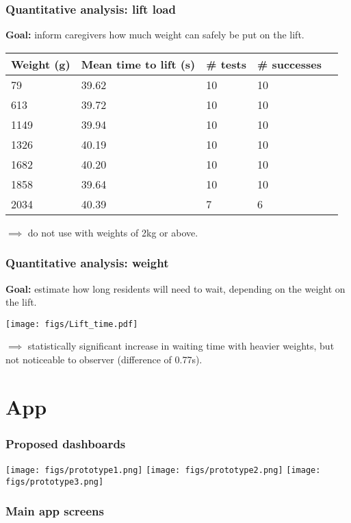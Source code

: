\documentclass{beamer}
\begin{document}
\begin{frame}
  \frametitle{Quantitative analysis: lift load}
  {\bf Goal: } inform caregivers how much weight can safely be put on the lift.
  \begin{center}
    \begin{tabular}{llllr}
      {\bf Weight (g)} & {\bf Mean time to lift (s)} & {\bf \# tests} & {\bf \# successes}\\
      \hline
      79 & 39.62  & 10 & 10  \\
      613 & 39.72 & 10 & 10 \\
      1149 & 39.94 & 10 & 10  \\
      1326 & 40.19 & 10 & 10 \\
      1682 & 40.20 & 10 & 10 \\
      1858 & 39.64 & 10 & 10  \\
      2034 & 40.39 & 7 & 6
    \end{tabular}
  \end{center}
  $\implies$ do not use with weights of 2kg or above. 
\end{frame}

\begin{frame}
  \frametitle{Quantitative analysis: weight}
  {\bf Goal: } estimate how long residents will need to wait, depending on the weight on the lift.
  \begin{center}
    \texttt{[image: figs/Lift\_time.pdf]}
  \end{center}
  $\implies$ statistically significant increase in waiting time with heavier weights, but not noticeable to observer (difference of 0.77s).
\end{frame}

\section{App}
\begin{frame}
  \frametitle{Proposed dashboards}
  \begin{center}
    \texttt{[image: figs/prototype1.png]}
    \texttt{[image: figs/prototype2.png]}
    \texttt{[image: figs/prototype3.png]}
  \end{center}
\end{frame}

\begin{frame}
  \frametitle{Main app screens}
\end{frame}
\end{document}
